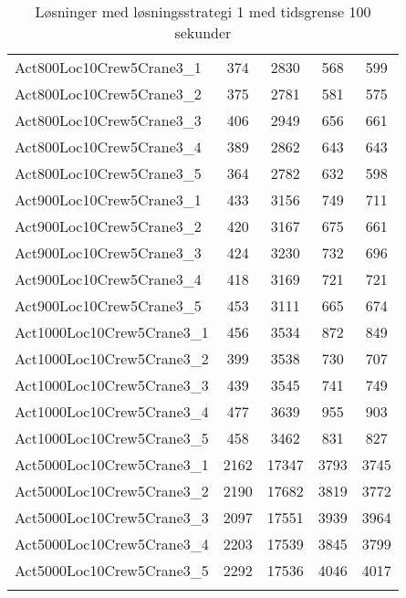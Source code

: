 \begin{center}
\begin{longtable}{ | l | c | c | c | c | }
Act800Loc10Crew5Crane3\_1	&	374	&	2830	&	568	&	599	\\
Act800Loc10Crew5Crane3\_2	&	375	&	2781	&	581	&	575	\\
Act800Loc10Crew5Crane3\_3	&	406	&	2949	&	656	&	661	\\
Act800Loc10Crew5Crane3\_4	&	389	&	2862	&	643	&	643	\\
Act800Loc10Crew5Crane3\_5	&	364	&	2782	&	632	&	598	\\
Act900Loc10Crew5Crane3\_1	&	433	&	3156	&	749	&	711	\\
Act900Loc10Crew5Crane3\_2	&	420	&	3167	&	675	&	661	\\
Act900Loc10Crew5Crane3\_3	&	424	&	3230	&	732	&	696	\\
Act900Loc10Crew5Crane3\_4	&	418	&	3169	&	721	&	721	\\
Act900Loc10Crew5Crane3\_5	&	453	&	3111	&	665	&	674	\\
Act1000Loc10Crew5Crane3\_1	&	456	&	3534	&	872	&	849	\\
Act1000Loc10Crew5Crane3\_2	&	399	&	3538	&	730	&	707	\\
Act1000Loc10Crew5Crane3\_3	&	439	&	3545	&	741	&	749	\\
Act1000Loc10Crew5Crane3\_4	&	477	&	3639	&	955	&	903	\\
Act1000Loc10Crew5Crane3\_5	&	458	&	3462	&	831	&	827	\\
Act5000Loc10Crew5Crane3\_1	&	2162	&	17347	&	3793	&	3745	\\
Act5000Loc10Crew5Crane3\_2	&	2190	&	17682	&	3819	&	3772	\\
Act5000Loc10Crew5Crane3\_3	&	2097	&	17551	&	3939	&	3964	\\
Act5000Loc10Crew5Crane3\_4	&	2203	&	17539	&	3845	&	3799	\\
Act5000Loc10Crew5Crane3\_5	&	2292	&	17536	&	4046	&	4017	\\	
\hline									
\caption{Løsninger med løsningsstrategi 1 med tidsgrense 100 sekunder}										
\label{tab:solutionAssignAltRFSTF100s}					
\end{longtable}									
\end{center}

